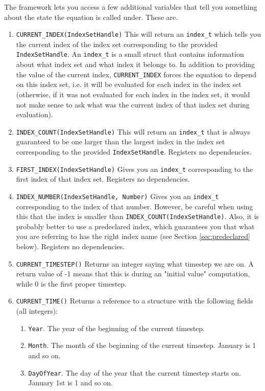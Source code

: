 \documentclass[11pt]{article}
\theoremstyle{definition}
\begin{document}
The framework lets you access a few additional variables that tell you something about the state the equation is called under. These are.
\begin{enumerate}[i]
\item {\tt CURRENT\_INDEX(IndexSetHandle)} This will return an {\tt index\_t} which tells you the current index of the index set corresponding to the provided {\tt IndexSetHandle}. An {\tt index\_t} is a small struct that contains information about what index set and what index it belongs to. In addition to providing the value of the current index, {\tt CURRENT\_INDEX} forces the equation to depend on this index set, i.e. it will be evaluated for each index in the index set (otherwise, if it was not evaluated for each index in the index set, it would not make sense to ask what was the current index of that index set during evaluation).
\item {\tt INDEX\_COUNT(IndexSetHandle)} This will return an {\tt index\_t} that is always guaranteed to be one larger than the largest index in the index set corresponding to the provided {\tt IndexSetHandle}. Registers no dependencies.
\item {\tt FIRST\_INDEX(IndexSetHandle)} Gives you an {\tt index\_t} corresponding to the first index of that index set. Registers no dependencies.
\item {\tt INDEX\_NUMBER(IndexSetHandle, Number)} Gives you an {\tt index\_t} corresponding to the index of that number. However, be careful when using this that the index is smaller than {\tt INDEX\_COUNT(IndexSetHandle)}. Also, it is probably better to use a predeclared index, which guarantees you that what you are referring to has the right index name  (see Section \ref{sec:predeclared} below). Registers no dependencies.
\item {\tt CURRENT\_TIMESTEP()} Returns an integer saying what timestep we are on. A return value of -1 means that this is during an "initial value" computation, while 0 is the first proper timestep.
\item {\tt CURRENT\_TIME()} Returns a reference to a structure with the following fields (all integers):
	\begin{enumerate}[1]
	\item {\tt Year}. The year of the beginning of the current timestep.
	\item {\tt Month}. The month of the beginning of the current timestep. January is 1 and so on.
	\item {\tt DayOfYear}. The day of the year that the current timestep starts on. January 1st is 1 and so on.

\end{enumerate}
\end{enumerate}
\end{document}
